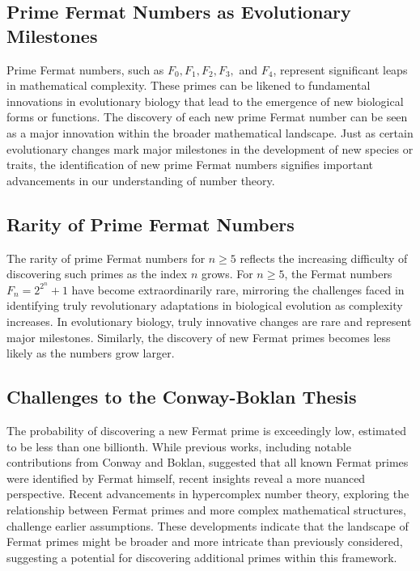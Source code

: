 \documentclass[12pt]{article}
\begin{document}
\subsection{Prime Fermat Numbers as Evolutionary Milestones}

Prime Fermat numbers, such as \( F_0, F_1, F_2, F_3, \) and \( F_4 \), represent significant leaps in mathematical complexity. These primes can be likened to fundamental innovations in evolutionary biology that lead to the emergence of new biological forms or functions. The discovery of each new prime Fermat number can be seen as a major innovation within the broader mathematical landscape. Just as certain evolutionary changes mark major milestones in the development of new species or traits, the identification of new prime Fermat numbers signifies important advancements in our understanding of number theory.

\subsection{Rarity of Prime Fermat Numbers}

The rarity of prime Fermat numbers for \( n \geq 5 \) reflects the increasing difficulty of discovering such primes as the index \( n \) grows. For \( n \geq 5 \), the Fermat numbers \( F_n = 2^{2^n} + 1 \) have become extraordinarily rare, mirroring the challenges faced in identifying truly revolutionary adaptations in biological evolution as complexity increases. In evolutionary biology, truly innovative changes are rare and represent major milestones. Similarly, the discovery of new Fermat primes becomes less likely as the numbers grow larger.

\subsection{Challenges to the Conway-Boklan Thesis}

The probability of discovering a new Fermat prime is exceedingly low, estimated to be less than one billionth. While previous works, including notable contributions from Conway and Boklan, suggested that all known Fermat primes were identified by Fermat himself, recent insights reveal a more nuanced perspective. Recent advancements in hypercomplex number theory, exploring the relationship between Fermat primes and more complex mathematical structures, challenge earlier assumptions. These developments indicate that the landscape of Fermat primes might be broader and more intricate than previously considered, suggesting a potential for discovering additional primes within this framework.
\end{document}

